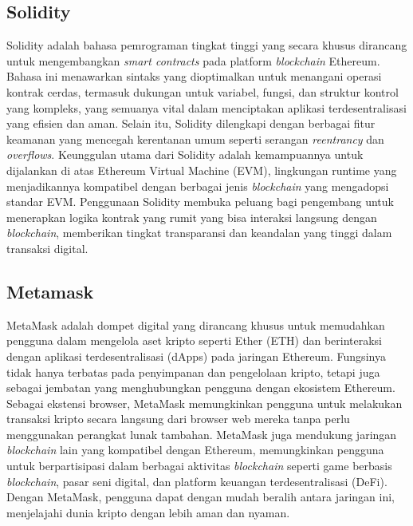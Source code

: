 \subsection{Solidity}

Solidity adalah bahasa pemrograman tingkat tinggi yang secara khusus dirancang untuk mengembangkan \emph{smart contracts} pada platform \emph{blockchain} Ethereum. Bahasa ini menawarkan sintaks yang dioptimalkan untuk menangani operasi kontrak cerdas, termasuk dukungan untuk variabel, fungsi, dan struktur kontrol yang kompleks, yang semuanya vital dalam menciptakan aplikasi terdesentralisasi yang efisien dan aman. Selain itu, Solidity dilengkapi dengan berbagai fitur keamanan yang mencegah kerentanan umum seperti serangan \emph{reentrancy} dan \emph{overflows}. Keunggulan utama dari Solidity adalah kemampuannya untuk dijalankan di atas Ethereum Virtual Machine (EVM), lingkungan runtime yang menjadikannya kompatibel dengan berbagai jenis \emph{blockchain} yang mengadopsi standar EVM. Penggunaan Solidity membuka peluang bagi pengembang untuk menerapkan logika kontrak yang rumit yang bisa interaksi langsung dengan \emph{blockchain}, memberikan tingkat transparansi dan keandalan yang tinggi dalam transaksi digital.

\subsection{Metamask}

MetaMask adalah dompet digital yang dirancang khusus untuk memudahkan pengguna dalam mengelola aset kripto seperti Ether (ETH) dan berinteraksi dengan aplikasi terdesentralisasi (dApps) pada jaringan Ethereum. Fungsinya tidak hanya terbatas pada penyimpanan dan pengelolaan kripto, tetapi juga sebagai jembatan yang menghubungkan pengguna dengan ekosistem Ethereum. Sebagai ekstensi browser, MetaMask memungkinkan pengguna untuk melakukan transaksi kripto secara langsung dari browser web mereka tanpa perlu menggunakan perangkat lunak tambahan. MetaMask juga mendukung jaringan \emph{blockchain} lain yang kompatibel dengan Ethereum, memungkinkan pengguna untuk berpartisipasi dalam berbagai aktivitas \emph{blockchain} seperti game berbasis \emph{blockchain}, pasar seni digital, dan platform keuangan terdesentralisasi (DeFi). Dengan MetaMask, pengguna dapat dengan mudah beralih antara jaringan ini, menjelajahi dunia kripto dengan lebih aman dan nyaman.

